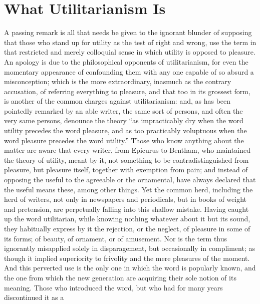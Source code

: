 
\author{John Stuart Mill}
\chapter{What Utilitarianism Is}


A passing remark is all that needs be given to the ignorant
blunder of supposing that those who stand up for utility as the test
of right and wrong, use the term in that restricted and merely
colloquial sense in which utility is opposed to pleasure. An apology
is due to the philosophical opponents of utilitarianism, for even the
momentary appearance of confounding them with any one capable of so
absurd a misconception; which is the more extraordinary, inasmuch as
the contrary accusation, of referring everything to pleasure, and that
too in its grossest form, is another of the common charges against
utilitarianism: and, as has been pointedly remarked by an able writer,
the same sort of persons, and often the very same persons, denounce
the theory ``as impracticably dry when the word utility precedes the
word pleasure, and as too practicably voluptuous when the word
pleasure precedes the word utility.'' Those who know anything about
the matter are aware that every writer, from Epicurus to Bentham, who
maintained the theory of utility, meant by it, not something to be
contradistinguished from pleasure, but pleasure itself, together with
exemption from pain; and instead of opposing the useful to the
agreeable or the ornamental, have always declared that the useful
 means these, among other things. Yet the common herd,
including the herd of writers, not only in newspapers and periodicals,
but in books of weight and pretension, are perpetually falling into
this shallow mistake. Having caught up the word utilitarian, while
knowing nothing whatever about it but its sound, they habitually
express by it the rejection, or the neglect, of pleasure in some of
its forms; of beauty, of ornament, or of amusement. Nor is the term
thus ignorantly misapplied solely in disparagement, but occasionally
in compliment; as though it implied superiority to frivolity and the
mere pleasures of the moment. And this perverted use is the only one
in which the word is popularly known, and the one from which the new
generation are acquiring their sole notion of its meaning. Those who
introduced the word, but who had for many years discontinued it as a
